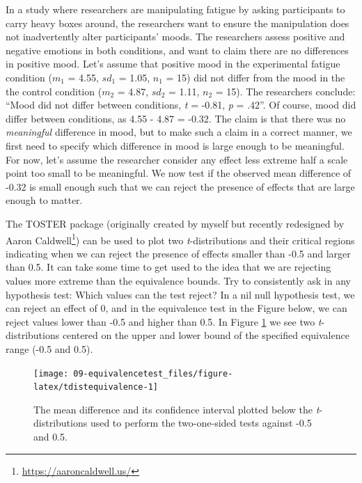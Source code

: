 \documentclass[
  oneside]{krantz}
\renewcommand{\href}[2]{#2\footnote{\url{#1}}}
\begin{document}
In a study where researchers are manipulating fatigue by asking participants to carry heavy boxes around, the researchers want to ensure the manipulation does not inadvertently alter participants' moods. The researchers assess positive and negative emotions in both conditions, and want to claim there are no differences in positive mood. Let's assume that positive mood in the experimental fatigue condition (\(m_1\) = 4.55, \(sd_1\) = 1.05, \(n_1\) = 15) did not differ from the mood in the the control condition (\(m_2\) = 4.87, \(sd_2\) = 1.11, \(n_2\) = 15). The researchers conclude: ``Mood did not differ between conditions, \emph{t} = -0.81, \emph{p} = .42''. Of course, mood did differ between conditions, as 4.55 - 4.87 = -0.32. The claim is that there was no \emph{meaningful} difference in mood, but to make such a claim in a correct manner, we first need to specify which difference in mood is large enough to be meaningful. For now, let's assume the researcher consider any effect less extreme half a scale point too small to be meaningful. We now test if the observed mean difference of -0.32 is small enough such that we can reject the presence of effects that are large enough to matter.

The TOSTER package (originally created by myself but recently redesigned by \href{https://aaroncaldwell.us/}{Aaron Caldwell}) can be used to plot two \emph{t}-distributions and their critical regions indicating when we can reject the presence of effects smaller than -0.5 and larger than 0.5. It can take some time to get used to the idea that we are rejecting values more extreme than the equivalence bounds. Try to consistently ask in any hypothesis test: Which values can the test reject? In a nil null hypothesis test, we can reject an effect of 0, and in the equivalence test in the Figure below, we can reject values lower than -0.5 and higher than 0.5. In Figure \ref{fig:tdistequivalence} we see two \emph{t}-distributions centered on the upper and lower bound of the specified equivalence range (-0.5 and 0.5).



\begin{figure}

{\centering \texttt{[image: 09-equivalencetest\_files/figure-latex/tdistequivalence-1]} 

}

\caption{The mean difference and its confidence interval plotted below the \emph{t}-distributions used to perform the two-one-sided tests against -0.5 and 0.5.}\label{fig:tdistequivalence}
\end{figure}
\end{document}
